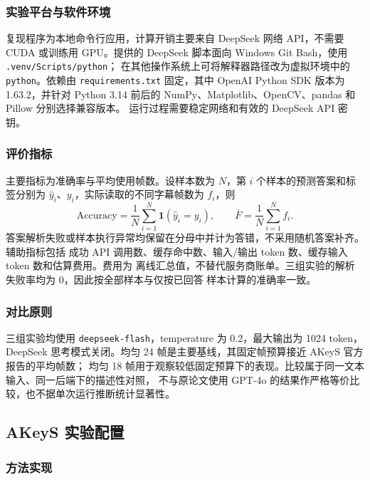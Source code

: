 \documentclass[12pt,UTF8]{ctexart}
\begin{document}
\subsubsection{实验平台与软件环境}

复现程序为本地命令行应用，计算开销主要来自 DeepSeek 网络 API，不需要 CUDA 或训练用
GPU。提供的 DeepSeek 脚本面向 Windows Git Bash，使用 \texttt{.venv/Scripts/python}；
在其他操作系统上可将解释器路径改为虚拟环境中的 \texttt{python}。依赖由
\texttt{requirements.txt} 固定，其中 OpenAI Python SDK 版本为 1.63.2，并针对
Python 3.14 前后的 NumPy、Matplotlib、OpenCV、pandas 和 Pillow 分别选择兼容版本。
运行过程需要稳定网络和有效的 DeepSeek API 密钥。

\subsubsection{评价指标}

主要指标为准确率与平均使用帧数。设样本数为 $N$，第 $i$ 个样本的预测答案和标签分别为
$\hat y_i$、$y_i$，实际读取的不同字幕帧数为 $f_i$，则
\begin{equation}
  \mathrm{Accuracy}=\frac{1}{N}\sum_{i=1}^{N}\mathbf{1}(\hat y_i=y_i),\qquad
  \overline F=\frac{1}{N}\sum_{i=1}^{N}f_i .
  \label{eq:metrics}
\end{equation}
答案解析失败或样本执行异常均保留在分母中并计为答错，不采用随机答案补齐。辅助指标包括
成功 API 调用数、缓存命中数、输入/输出 token 数、缓存输入 token 数和估算费用。费用为
离线汇总值，不替代服务商账单。三组实验的解析失败率均为 0，因此按全部样本与仅按已回答
样本计算的准确率一致。

\subsubsection{对比原则}

三组实验均使用 \texttt{deepseek-flash}，temperature 为 0.2，最大输出为 1024 token，
DeepSeek 思考模式关闭。均匀 24 帧是主要基线，其固定帧预算接近 AKeyS 官方报告的平均帧数；
均匀 18 帧用于观察较低固定预算下的表现。比较属于同一文本输入、同一后端下的描述性对照，
不与原论文使用 GPT-4o 的结果作严格等价比较，也不据单次运行推断统计显著性。

\subsection{AKeyS 实验配置}

\subsubsection{方法实现}
\end{document}
